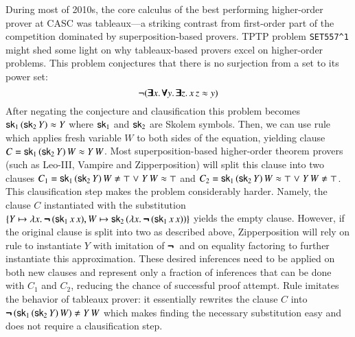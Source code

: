 During most of 2010s, the core calculus of the best performing
higher-order prover at CASC was tableaux---a striking contrast from first-order part
of the competition dominated by superposition-based provers. TPTP
problem \verb|SET557^1| might shed some light on why tableaux-based provers
excel on higher-order problems.
This problem conjectures that there is
no surjection from a set to its power set: 
$$ \neg (\pmb{\exists} x. \, \pmb{\forall} y. \,
\pmb{\exists} z. \, x \, z \approx y) $$ 
After negating the conjecture and
clausification this problem becomes $ \mathsf{sk}_1 \, (\mathsf{sk}_2 \, Y) \approx Y   $
where $\mathsf{sk}_1$ and $\mathsf{sk}_2$ are Skolem symbols. Then, we can use
 rule \cite{bbtvw-21-sup-lam} which applies
fresh variable $W$ to both sides of the equation, yielding clause $ C = \mathsf{sk}_1 \, (\mathsf{sk}_2 \, Y) \, W
\approx Y \, W$. Most superposition-based higher-order theorem
provers (such as Leo-III, Vampire and Zipperposition) will split this clause
into two clauses $C_1 = \cst{sk}_1 \, (\cst{sk}_2 \, Y) \, W \not\eq \top \llor Y
\, W \eq \top $ and $ C_2 =  \cst{sk}_1 \, (\cst{sk}_2 \, Y) \, W \eq \top \llor
Y \, W \not\eq \top $. This clausification step makes the problem
considerably harder. Namely, the clause $C$ instantiated with the substitution $
\{ Y \mapsto \lambda x.\> \pmb{\neg\,} (\mathsf{sk}_1 \, x \, x), W \mapsto \mathsf{sk}_2 \,
(\lambda x.\> \pmb{\neg\,} (\mathsf{sk}_1 \, x \, x)) \} $ yields the empty clause. However,
if the original clause is split into two as described above, Zipperposition will
rely on  rule to instantiate $Y$ with imitation of $\pmb{\neg\,}$ and on
equality factoring to further instantiate this approximation. These desired
inferences need to be applied on both new clauses and represent only a fraction
of inferences that can be done with $C_1$ and $C_2$, reducing the chance of
successful proof attempt. Rule  imitates the behavior of
tableaux prover: it essentially rewrites the clause $C$ into $ \inot (\cst{sk}_1 \,
(\cst{sk}_2 \, Y) \, W) \not\eq Y \, W $ which makes finding the necessary substitution easy and
does not require a clausification step.

